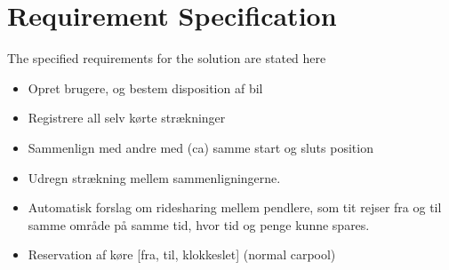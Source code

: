 \section{Requirement Specification}

The specified requirements for the solution are stated here
\begin{itemize}
	\item Opret brugere, og bestem disposition af bil
	\item Registrere all selv kørte strækninger
	\item Sammenlign med andre med (ca) samme start og sluts position
	\item Udregn strækning mellem sammenligningerne. 
	\item Automatisk forslag om ridesharing mellem pendlere, som tit rejser fra og til samme område på samme tid, hvor tid og penge kunne spares.
	\item Reservation af køre [fra, til, klokkeslet] (normal carpool)
\end{itemize}
